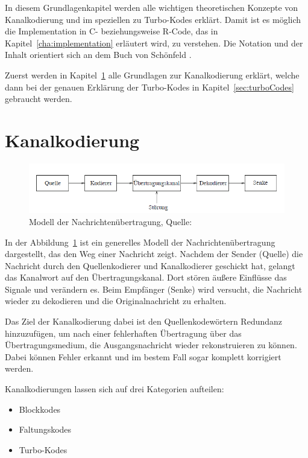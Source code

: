 In diesem Grundlagenkapitel werden alle wichtigen theoretischen Konzepte von Kanalkodierung und im speziellen zu Turbo-Kodes erklärt. Damit ist es möglich die Implementation in C- beziehungsweise R-Code, das in Kapitel~\ref{cha:implementation} erläutert wird, zu verstehen. Die Notation und der Inhalt orientiert sich an dem Buch von Schönfeld \cite{schoenfeld2012informations}.

Zuerst werden in Kapitel~\ref{sec:channelcoding} alle Grundlagen zur Kanalkodierung erklärt, welche dann bei der genauen Erklärung der Turbo-Kodes in Kapitel~\ref{sec:turboCodes} gebraucht werden.

\section{Kanalkodierung}
\label{sec:channelcoding}

\begin{figure}[th]
\centering
\includegraphics[width=\ScaleIfNeeded]{pictures/Channelmodel}
\caption{Modell der Nachrichtenübertragung, Quelle: \cite[10]{schoenfeld2012informations}}
\label{pic:channelmodel}
\end{figure}

In der Abbildung~\ref{pic:channelmodel} ist ein generelles Modell der Nachrichtenübertragung dargestellt, das den Weg einer Nachricht zeigt. Nachdem der Sender (Quelle) die Nachricht durch den Quellenkodierer und Kanalkodierer geschickt hat, gelangt das Kanalwort auf den Übertragungskanal. Dort stören äußere Einflüsse das Signale und verändern es. Beim Empfänger (Senke) wird versucht, die Nachricht wieder zu dekodieren und die Originalnachricht zu erhalten.

Das Ziel der Kanalkodierung dabei ist den Quellenkodewörtern Redundanz hinzuzufügen, um nach einer fehlerhaften Übertragung über das Übertragungsmedium, die Ausgangsnachricht wieder rekonstruieren zu können. Dabei können Fehler erkannt und im bestem Fall sogar komplett korrigiert werden.

Kanalkodierungen lassen sich auf drei Kategorien aufteilen:

\begin{itemize}
\item Blockkodes
\item Faltungskodes
\item Turbo-Kodes
\end{itemize} 

